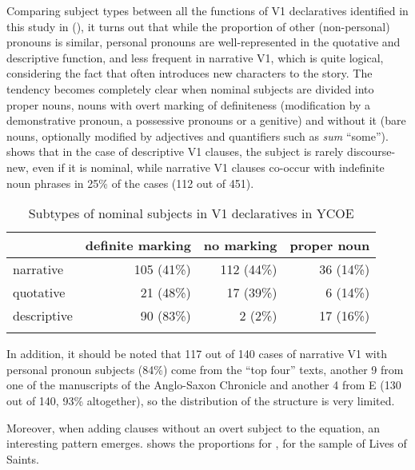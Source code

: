 \documentclass[output=paper,colorlinks,citecolor=brown]{langscibook}
\begin{document}
Comparing subject types between all the functions of V1 declaratives identified in this study in  (), it turns out that while the proportion of other (non-personal) pronouns is similar, personal pronouns are well-represented in the quotative and descriptive function, and less frequent in narrative V1, which is quite logical, considering the fact that  often introduces new characters to the story. The tendency becomes completely clear when nominal subjects are divided into proper nouns, nouns with overt marking of definiteness (modification by a demonstrative pronoun, a possessive pronouns or a genitive) and without it (bare nouns, optionally modified by adjectives and quantifiers such as \textit{sum} “some”).  shows that in the case of descriptive V1 clauses, the subject is rarely discourse-new, even if it is nominal, while narrative V1 clauses co-occur with indefinite noun phrases in 25\% of the cases (112 out of 451).

\begin{table}
\begin{tabularx}{0.8\textwidth}{Xrrr}
\lsptoprule
& \multicolumn{1}{l}{definite marking} & \multicolumn{1}{l}{no marking} & \multicolumn{1}{l}{proper noun}\\
\midrule
narrative & 105 (41\%) & 112 (44\%) & 36 (14\%) \\
quotative & 21 (48\%) & 17 (39\%) & 6 (14\%)\\
descriptive & 90 (83\%) & 2 (2\%) & 17 (16\%)\\
\lspbottomrule
\end{tabularx}
\caption{Subtypes of nominal subjects in V1 declaratives in YCOE}
\label{tab:cichosz:8}
\end{table}

In addition, it should be noted that 117 out of 140 cases of narrative V1 with personal pronoun subjects (84\%) come from the “top four” texts, another 9 from one of the manuscripts of the Anglo-Saxon Chronicle and another 4 from  E (130 out of 140, 93\% altogether), so the distribution of the structure is very limited.

Moreover, when adding clauses without an overt subject to the equation, an interesting pattern emerges.  shows the proportions for ,  for the sample of Lives of Saints.
\end{document}
